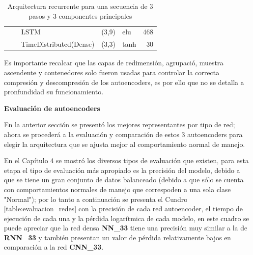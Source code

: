 \begin{table}[H]
\begin{center}
\begin{tabular}{ll|l|r|l|r|}
\multicolumn{1}{|l|}{}                              &                             & LSTM                               & (3,9)                                & elu                                     & 468                                         \\ \cline{3-6} 
\multicolumn{1}{|l|}{}                              &                             & TimeDistributed(Dense)             & (3,3)                                & tanh                                     & 30                                          \\ \hline
\end{tabular}
\end{center}
\caption{Arquitectura recurrente para una secuencia de 3 pasos y 3 componentes principales}
\label{table:rnn33}
\end{table}

Es importante recalcar que las capas de redimensi\'{o}n, agrupaci\'{o}, muestra ascendente y contenedores solo fueron usadas para controlar la correcta compresi\'{o}n y descompresi\'{o}n de los autoencoders, es por ello que no se detalla a pronfundidad su funcionamiento.

\vspace{5mm} %

\textbf{Evaluaci\'{o}n de autoencoders}

\vspace{5mm} %

En la anterior secci\'{o}n se present\'{o} los mejores representantes por tipo de red; ahora se proceder\'{a} a la evaluaci\'{o}n y comparaci\'{o}n de estos 3 autoencoders para elegir la arquitectura que se ajusta mejor al comportamiento normal de manejo.

\vspace{5mm} %

En el Cap\'{i}tulo 4 se mostr\'{o} los diversos tipos de evaluaci\'{o}n que existen, para esta etapa el tipo de evaluaci\'{o}n m\'{a}s apropiado es la precisi\'{o}n del modelo, debido a que se tiene un gran conjunto de datos balanceado (debido a que s\'{o}lo se cuenta con comportamientos normales de manejo que correspoden a una sola clase "Normal"); por lo tanto a continuaci\'{o}n se presenta el Cuadro \ref{table:evaluacion_redes} con la precisi\'{o}n de cada red autoencoder, el tiempo de ejecuci\'{o}n de cada una y la p\'{e}rdida logar\'{i}tmica de cada modelo, en este cuadro se puede apreciar que la red densa \textbf{NN\_33} tiene una precisi\'{o}n muy similar a la de \textbf{RNN\_33} y tambi\'{e}n presentan un valor de p\'{e}rdida relativamente bajos en comparaci\'{o}n a la red \textbf{CNN\_33}. 

